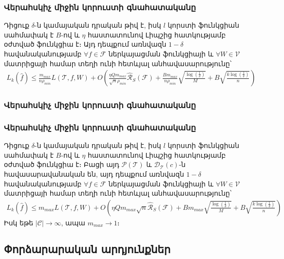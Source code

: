 \documentclass[10pt]{beamer}
\begin{document}
\begin{frame}
\frametitle{\armfont Վերահսկիչ միջին կորուստի գնահատականը}
 \fontsize{7pt}{7pt} 
\begin{exampleblock}{} \armfont
Դիցուք $\delta$-ն կամայական դրական թիվ է,  իսկ $l$ կորստի ֆունկցիան սահմափակ է $B$-ով և $\eta$ հաստատունով Լիպշից հատկությամբ օժտված ֆունկցիա է։ Այդ դեպքում առնվազն $1-\delta$ հավանականությամբ $\forall f \in \mathcal{F}$ ներկայացման ֆունկցիայի և $\forall W \in \mathcal{V}$ մատրիցայի համար տեղի ունի հետևյալ անհավասարությունը՝ 
\begin{align*}
L_k(\hat{f}) \leq  \frac{m_{max}}{n \rho_{min}}  L(\mathcal{T}, f, W)+ O\left(
\frac{\eta Qm_{max}}{\sqrt{n}\rho_{min}} \hat{\mathcal{R}}_S(\mathcal{F})+    \frac{Bm_{max}}{n\rho_{min}}\sqrt{\frac{\log \left( \frac{1}{\delta} \right)}{M}} + B\sqrt{\frac{k\log \left(\frac{1}{\delta}\right) }{n}} \right)
\end{align*}
\end{exampleblock}
\end{frame}

\begin{frame}
\frametitle{\armfont Վերահսկիչ միջին կորուստի գնահատականը}
\end{frame}

\begin{frame}
\frametitle{\armfont Վերահսկիչ միջին կորուստի գնահատականը}
 \fontsize{7pt}{7pt} 
\begin{exampleblock}{} \armfont
Դիցուք $\delta$-ն կամայական դրական թիվ է, իսկ $l$ կորստի ֆունկցիան սահմափակ է $B$-ով և $\eta$ հաստատունով Լիպշից հատկությամբ օժտված ֆունկցիա է։ Բացի այդ $\mathcal{P}(\mathcal{T})$ և $\mathcal{D}_\mathcal{T}(c)$-ն հավասարավանական են, այդ դեպքում առնվազն $1-\delta$ հավանականությամբ $\forall f \in \mathcal{F}$ ներկայացման ֆունկցիայի և $\forall W \in \mathcal{V}$ մատրիցայի համար տեղի ունի հետևյալ անհավասարությունը՝ 
\begin{align*}
L_k(\hat{f}) \leq m_{max}  L(\mathcal{T}, f, W)+ O\left(
\eta Qm_{max}\sqrt{n} \hat{\mathcal{R}}_S(\mathcal{F})+   Bm_{max}\sqrt{\frac{\log \left( \frac{1}{\delta} \right)}{M}} + B\sqrt{\frac{k\log \left(\frac{1}{\delta}\right) }{n}} \right)
\end{align*}
Իսկ եթե $|\mathcal{C}| \rightarrow \infty$, ապա $m_{max} \rightarrow 1$։
\end{exampleblock}
\end{frame}


\subsection{\armfont Փորձարարական արդյունքներ}
\end{document}

